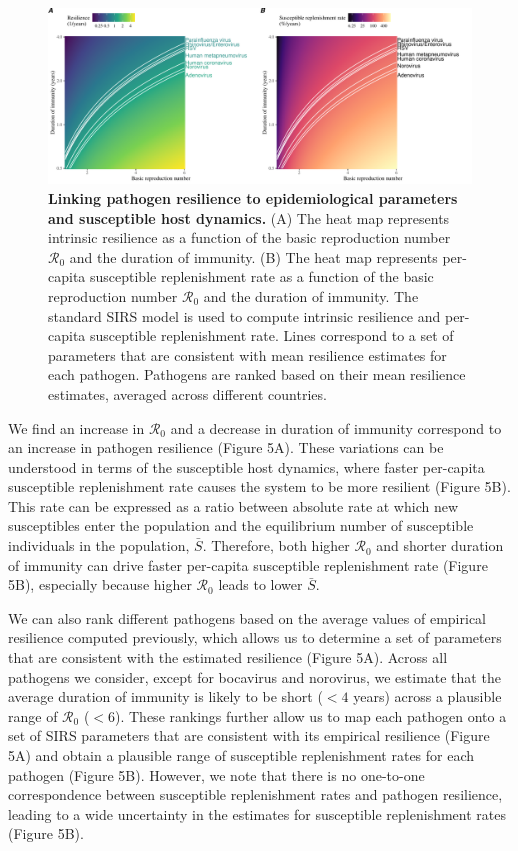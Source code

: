 \documentclass[12pt]{article}
\begin{document}
\begin{figure}[!th]
\begin{center}
\includegraphics[width=\textwidth]{../figure5/figure5.pdf}
\caption{
\textbf{Linking pathogen resilience to epidemiological parameters and susceptible host dynamics.}
(A) The heat map represents intrinsic resilience as a function of the basic reproduction number $\mathcal R_0$ and the duration of immunity.
(B) The heat map represents per-capita susceptible replenishment rate as a function of the basic reproduction number $\mathcal R_0$ and the duration of immunity.
The standard SIRS model is used to compute intrinsic resilience and per-capita susceptible replenishment rate.
Lines correspond to a set of parameters that are consistent with mean resilience estimates for each pathogen.
Pathogens are ranked based on their mean resilience estimates, averaged across different countries.
}
\end{center}
\end{figure}

We find an increase in $\mathcal R_0$ and a decrease in duration of immunity correspond to an increase in pathogen resilience (Figure 5A).
These variations can be understood in terms of the susceptible host dynamics, where faster per-capita susceptible replenishment rate causes the system to be more resilient (Figure 5B).
This rate can be expressed as a ratio between absolute rate at which new susceptibles enter the population and the equilibrium number of susceptible individuals in the population, $\bar{S}$.
Therefore, both higher $\mathcal R_0$ and shorter duration of immunity can drive faster per-capita susceptible replenishment rate (Figure 5B), especially because higher $\mathcal R_0$ leads to lower $\bar{S}$.

We can also rank different pathogens based on the average values of empirical resilience computed previously, which allows us to determine a set of parameters that are consistent with the estimated resilience (Figure 5A).
Across all pathogens we consider, except for bocavirus and norovirus, we estimate that the average duration of immunity is likely to be short ($<4$ years) across a plausible range of $\mathcal R_0$ ($<6$).
These rankings further allow us to map each pathogen onto a set of SIRS parameters that are consistent with its empirical resilience (Figure 5A) and obtain a plausible range of susceptible replenishment rates for each pathogen (Figure 5B).
However, we note that there is no one-to-one correspondence between susceptible replenishment rates and pathogen resilience, leading to a wide uncertainty in the estimates for susceptible replenishment rates (Figure 5B).
\end{document}
